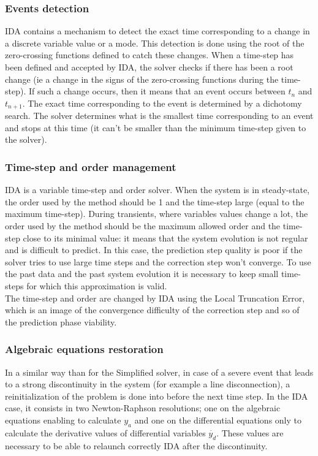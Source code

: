 \documentclass[a4paper, 12pt]{report}
\begin{document}
\subsubsection{Events detection}

\ac{IDA} contains a mechanism to detect the exact time corresponding to a change in a discrete variable value or a mode. This detection is done using the root of the zero-crossing functions defined to catch these changes.
When a time-step has been defined and accepted by \ac{IDA}, the solver checks if there has been a root change (ie a change in the signs of the zero-crossing functions during the time-step). If such a change occurs, then it means that an event occurs between $t_{n}$ and $t_{n+1}$. The exact time corresponding to the event is determined by a dichotomy search.
The solver determines what is the smallest time corresponding to an event and stops at this time (it can't be smaller than the minimum time-step given to the solver).

\subsubsection{Time-step and order management}

\ac{IDA} is a variable time-step and order solver. When the system is in steady-state, the order used by the method should be 1 and the time-step large (equal to the maximum time-step). During transients, where variables values change a lot, the order used by the method should be the maximum allowed order and the time-step close to its minimal value: it means that the system evolution is not regular and is difficult to predict. In this case, the prediction step quality is poor if the solver tries to use large time steps and the correction step won't converge. To use the past data and the past system evolution it is necessary to keep small time-steps for which this approximation is valid. \\

The time-step and order are changed by \ac{IDA} using the Local Truncation Error, which is an image of the convergence difficulty of the correction step and so of the prediction phase viability.

\subsubsection{Algebraic equations restoration}

In a similar way than for the Simplified solver, in case of a severe event that leads to a strong discontinuity in the system (for example a line disconnection), a reinitialization of the problem is done into \Dynawo before the next time step.
In the \ac{IDA} case, it consists in two Newton-Raphson resolutions; one on the algebraic equations enabling to calculate $y_a$ and one on the differential equations only to calculate the derivative values of differential variables $\dot{y_d}$. These values are necessary to be able to relaunch correctly \ac{IDA} after the discontinuity.



\end{document}
